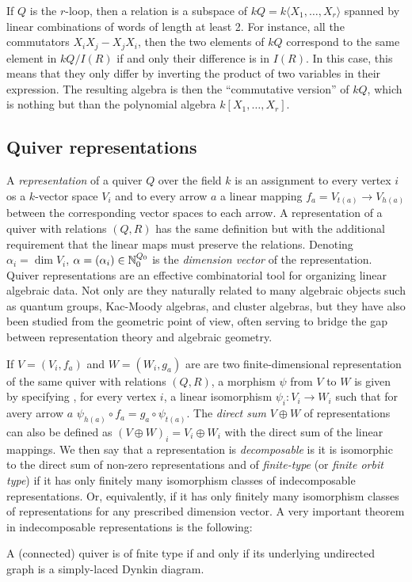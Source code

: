         \begin{examp*}
            If $Q$ is the $r$-loop, then a relation is a subspace of $kQ = k\langle X_1,\dots,X_r\rangle$ spanned by linear combinations of words of length at least 2. For instance, all the commutators $X_iX_j-X_jX_i$, then the two elements of $kQ$ correspond to the same element in $kQ/I(R)$ if and only their difference is in $I(R)$. In this case, this means that they only differ by inverting the product of two variables in their expression. The resulting algebra is then the ``commutative version'' of $kQ$, which is nothing but than the polynomial algebra $k[X_1,\dots,X_r]$.
        \end{examp*}

    \subsection{Quiver representations}

        A \emph{representation} of a quiver $Q$ over the field $k$ is an assignment to every vertex $i$ os a $k$-vector space $V_i$ and to every arrow $a$ a linear mapping $f_a=V_{t(a)}\to V_{h(a)}$ between the corresponding vector spaces to each arrow. A representation of a quiver with relations $(Q,R)$ has the same definition but with the additional requirement that the linear maps must preserve the relations.  Denoting $\alpha_i=\dim V_i$, $\alpha=(\alpha_i)\in\mathbb{N}^{Q_0}_0$ is the \emph{dimension vector} of the representation. Quiver representations are an effective combinatorial tool for organizing linear algebraic data. Not only are they naturally related to many algebraic objects such as quantum groups, Kac-Moody algebras, and cluster algebras, but they have also been studied from the geometric point of view, often serving to bridge the gap between representation theory and algebraic geometry. 
        
        If $V=(V_i,f_a)$ and $W=(W_i,g_a)$ are are two finite-dimensional representation of the same quiver with relations $(Q,R)$, a morphism $\psi$ from $V$ to $W$ is given by specifying , for every vertex $i$, a linear isomorphism $\psi_i:V_i\to W_i$ such that for avery arrow $a$ $\psi_{h(a)}\circ f_a=g_a\circ\psi_{t(a)}$. The \emph{direct sum} $V\oplus W$ of representations can also be defined as $(V\oplus W)_i=V_i\oplus W_i$ with the direct sum of the linear mappings. We then say that a representation is \emph{decomposable} is it is isomorphic to the direct sum of non-zero representations and of \emph{finite-type} (or \emph{finite orbit type}) if it has only finitely many isomorphism classes of indecomposable representations. Or, equivalently, if it has only finitely many isomorphism classes of representations for any prescribed dimension vector. A very important theorem in indecomposable representations is the following:
        \begin{theorem*}[Gabriel]
            A (connected) quiver is of fnite type if and only if its underlying undirected graph is a simply-laced Dynkin diagram.
        \end{theorem*}
        

